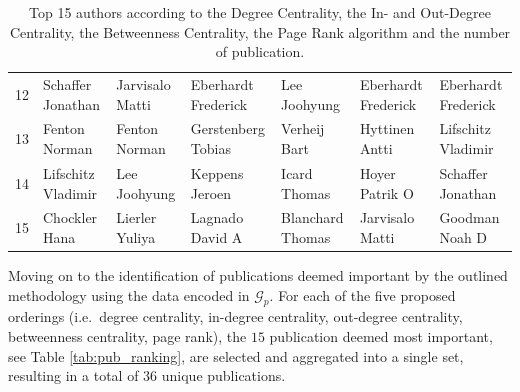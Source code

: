 \documentclass[11pt,a4paper]{book}
\theoremstyle{definition}
\theoremstyle{definition}
\theoremstyle{definition}
\theoremstyle{remark}
\newcommand{\prset}{S_{A}}
\newcommand{\pgraph}{\mathcal{G}_{p}}
\begin{document}
\begin{table}
\begin{tabular}{lllllll}
12 &      Schaffer Jonathan &        Jarvisalo Matti &    Eberhardt Frederick &           Lee Joohyung &    Eberhardt Frederick &    Eberhardt Frederick \\
13 &          Fenton Norman &          Fenton Norman &     Gerstenberg Tobias &           Verheij Bart &         Hyttinen Antti &     Lifschitz Vladimir \\
14 &     Lifschitz Vladimir &           Lee Joohyung &         Keppens Jeroen &           Icard Thomas &         Hoyer Patrik O &      Schaffer Jonathan \\
15 &          Chockler Hana &         Lierler Yuliya &        Lagnado David A &       Blanchard Thomas &        Jarvisalo Matti &         Goodman Noah D \\
\bottomrule
\end{tabular}
\caption{Top 15 authors according to the Degree Centrality, the In- and Out-Degree Centrality, the Betweenness Centrality, the Page Rank algorithm and the number of publication.}
\label{tab:author_ranking}
\end{table}

\bigskip


Moving on to the identification of publications deemed important by the outlined methodology using the data encoded in $\pgraph$.
For each of the five proposed orderings (i.e.\ degree centrality, in-degree centrality, out-degree centrality, betweenness centrality, page rank), the $15$ publication deemed most important, see Table \ref{tab:pub_ranking}, are selected and aggregated into a single set, resulting in a total of $36$ unique publications.
\end{document}
